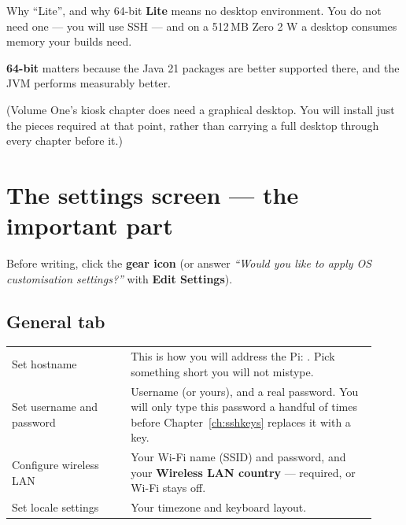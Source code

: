 \begin{concept}{Why ``Lite'', and why 64-bit}
\textbf{Lite} means no desktop environment. You do not need one --- you will use
SSH --- and on a 512\,MB Zero 2 W a desktop consumes memory your builds need.

\textbf{64-bit} matters because the Java 21 packages are better supported there,
and the JVM performs measurably better.

(Volume One's kiosk chapter does need a graphical desktop. You will install just
the pieces required at that point, rather than carrying a full desktop through
every chapter before it.)
\end{concept}

\section{The settings screen --- the important part}

Before writing, click the \textbf{gear icon} (or answer \emph{``Would you like to
apply OS customisation settings?''} with \textbf{Edit Settings}).

\subsection*{General tab}

\begin{center}\small
\begin{tabular}{@{}L{0.30\linewidth}L{0.62\linewidth}@{}}
\toprule
{} &  \\
\midrule
Set hostname &  \newline
  {\small This is how you will address the Pi: . Pick
   something short you will not mistype.} \\
Set username and password & Username  (or yours), and a real
  password. \newline
  {\small You will only type this password a handful of times before
   Chapter~\ref{ch:sshkeys} replaces it with a key.} \\
Configure wireless LAN & Your Wi-Fi name (SSID) and password, and your
  \textbf{Wireless LAN country} --- required, or Wi-Fi stays off. \\
Set locale settings & Your timezone and keyboard layout. \\
\bottomrule
\end{tabular}
\end{center}

